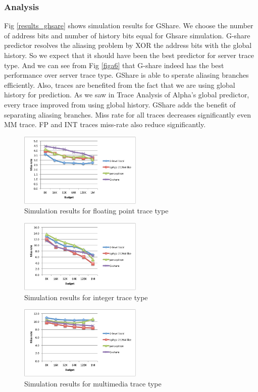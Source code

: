 \documentclass[conference]{IEEEtran}
\begin{document}
\subsubsection{Analysis}
Fig \ref{results_ghsare} shows simulation results for GShare. We choose the number of address bits and number of history bits equal for Ghsare simulation. G-share predictor resolves the aliasing problem by XOR the address bits with the global history. So we expect that it should have been the best predictor for server trace type. And we can see from Fig \ref{figa6} that G-share indeed has the best performance over server trace type.
GShare is able to sperate aliasing branches efficiently. Also, traces are benefited from the fact that we are using global history for prediction. As we saw in Trace Analysis of Alpha's global predictor, every trace improved from using global history. GShare adds the benefit of separating aliasing branches. Miss rate for all traces decreases significantly even MM trace. FP and INT traces miss-rate also reduce significantly. 
\begin{figure}[!t]
    \centering
    \includegraphics[width=2.3in]{FP}
    \caption{Simulation results for floating point trace type}
    \label{figa3}
\end{figure}

\begin{figure}[!t]
    \centering
    \includegraphics[width=2.3in]{INT}
    \caption{Simulation results for integer trace type}
    \label{figa4}
\end{figure}

\begin{figure}[!t]
    \centering
    \includegraphics[width=2.3in]{MM}
    \caption{Simulation results for multimedia trace type}
    \label{figa5}
\end{figure}
\end{document}
